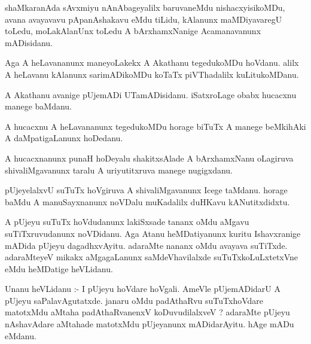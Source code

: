 \documentclass{article}
\begin{document}
\begin{mn}
shaMkaranAda  sAvxmiyu  nAnAbageyalilx  baruvaneMdu  nishacxyisikoMDu,  avana  avayavavu  pApanAshakavu  eMdu  tiLidu,  
kAlanunx  maMDiyavaregU  toLedu,  moLakAlanUnx  toLedu  A  bArxhamxNanige  Acamanavanunx  mADisidanu.
\end{mn}

\begin{mn}
Aga  A  heLavananunx  maneyoLakekx  A  Akathanu  tegedukoMDu  hoVdanu.  alilx  A  heLavanu  kAlanunx  sarimADikoMDu  koTaTx  piVThadalilx  kuLitukoMDanu.
\end{mn}

\begin{mn}
A  Akathanu  avanige  pUjemADi  UTamADisidanu.  iSatxroLage  obabx  hucacxnu  manege  baMdanu.  
\end{mn}

\begin{mn}
A  hucacxnu  A  heLavananunx  tegedukoMDu  horage  biTuTx  A  manege  beMkihAki  A  daMpatigaLanunx  hoDedanu.
\end{mn}

\begin{mn}
A  hucacxnanunx  punaH  hoDeyalu  shakitxsAlade  A  bArxhamxNanu  oLagiruva  shivaliMgavanunx  taralu  A  uriyutitxruva  manege  nugigxdanu.  
\end{mn}

\begin{mn}
pUjeyelalxvU  suTuTx  hoVgiruva  A  shivaliMgavanunx  Icege  taMdanu.  horage  baMdu  A  manuSayxnanunx  noVDalu  muKadalilx  duHKavu  kANutitxdidxtu.  
\end{mn}

\begin{mn}
A  pUjeyu  suTuTx  hoVdudanunx  lakiSxsade  tananx  oMdu  aMgavu  suTiTxruvudanunx  noVDidanu.  Aga  Atanu  heMDatiyanunx  
kuritu  Ishavxranige  mADida  pUjeyu  dagadhxvAyitu.  adaraMte  nananx  oMdu  avayava  suTiTxde.  adaraMteyeV  mikakx  
aMgagaLanunx  saMdeVhavilalxde  suTuTxkoLuLxtetxVne  eMdu  heMDatige  heVLidanu.  
\end{mn}

\begin{mn}
Unanu  heVLidanu :- I  pUjeyu  hoVdare  hoVgali.  AmeVle  pUjemADidarU  A  pUjeyu  saPalavAgutatxde.  janaru  oMdu  padAthaRvu  
suTuTxhoVdare  matotxMdu  aMtaha  padAthaRvanenxV  koDuvudilalxveV ?  adaraMte  pUjeyu  nAshavAdare  aMtahade  matotxMdu  
pUjeyanunx  mADidarAyitu.  hAge  mADu  eMdanu.
\end{mn}
\end{document}
